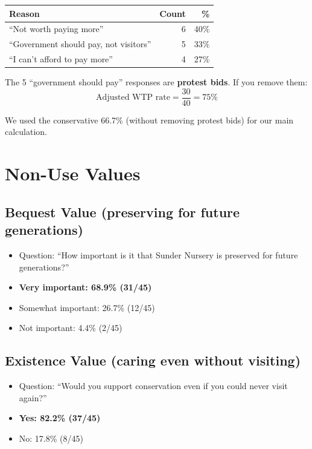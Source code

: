 \documentclass[11pt, a4paper]{article}
\begin{document}
\begin{table}[h]
\centering
\begin{tabular}{lrr}
\toprule
\textbf{Reason} & \textbf{Count} & \textbf{\%} \\
\midrule
``Not worth paying more'' & 6 & 40\% \\
``Government should pay, not visitors'' & 5 & 33\% \\
``I can't afford to pay more'' & 4 & 27\% \\
\bottomrule
\end{tabular}
\end{table}

The 5 ``government should pay'' responses are \textbf{protest bids}. If you remove them:
\[
\text{Adjusted WTP rate} = \frac{30}{40} = 75\%
\]

We used the conservative 66.7\% (without removing protest bids) for our main calculation.

\section{Non-Use Values}

\subsection{Bequest Value (preserving for future generations)}
\begin{itemize}[nosep]
    \item Question: ``How important is it that Sunder Nursery is preserved for future generations?''
    \item \textbf{Very important: 68.9\% (31/45)}
    \item Somewhat important: 26.7\% (12/45)
    \item Not important: 4.4\% (2/45)
\end{itemize}

\subsection{Existence Value (caring even without visiting)}
\begin{itemize}[nosep]
    \item Question: ``Would you support conservation even if you could never visit again?''
    \item \textbf{Yes: 82.2\% (37/45)}
    \item No: 17.8\% (8/45)
\end{itemize}
\end{document}
